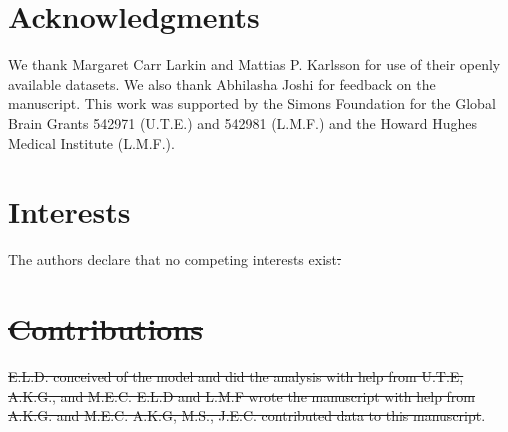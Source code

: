 \documentclass[9pt,lineno]{elife}
\providecommand{\DIFdel}[1]{{\protect\color{red}\sout{#1}}}                      %
\providecommand{\DIFdelbegin}{} %
\providecommand{\DIFdelend}{} %
\newcommand{\DIFscaledelfig}{0.5}
\newlength{\DIFdelgraphicswidth} %
\newlength{\DIFdelgraphicsheight} %
\newcommand{\DIFdelincludegraphics}[2][]{%
\sbox{\DIFdelgraphicsbox}{\DIFOincludegraphics[#1]{#2}}%
\settoboxwidth{\DIFdelgraphicswidth}{\DIFdelgraphicsbox} %
\settoboxtotalheight{\DIFdelgraphicsheight}{\DIFdelgraphicsbox} %
\scalebox{\DIFscaledelfig}{%
\parbox[b]{\DIFdelgraphicswidth}{\usebox{\DIFdelgraphicsbox}\\[-\baselineskip] \rule{\DIFdelgraphicswidth}{0em}}\llap{\resizebox{\DIFdelgraphicswidth}{\DIFdelgraphicsheight}{%
\setlength{\unitlength}{\DIFdelgraphicswidth}%
\begin{picture}(1,1)%
\thicklines\linethickness{2pt} %
{\color[rgb]{1,0,0}\put(0,0){\framebox(1,1){}}}%
{\color[rgb]{1,0,0}\put(0,0){\line( 1,1){1}}}%
{\color[rgb]{1,0,0}\put(0,1){\line(1,-1){1}}}%
\end{picture}%
}\hspace*{3pt}}} %
} %
\DeclareRobustCommand{\DIFdelbegin}{\DIFOdelbegin \let\includegraphics\DIFdelincludegraphics} %
\DeclareRobustCommand{\DIFdelend}{\DIFOaddend \let\includegraphics\DIFOincludegraphics} %
\begin{document}
\section{Acknowledgments}
We thank Margaret Carr Larkin and Mattias P. Karlsson for use of their openly available datasets. We also thank Abhilasha Joshi for feedback on the manuscript. This work was supported by the Simons Foundation for the Global Brain Grants 542971 (U.T.E.) and 542981 (L.M.F.) and the Howard Hughes Medical Institute (L.M.F.).

\section{Interests}
The authors declare that no competing interests exist\DIFdelbegin \DIFdel{.
}%

\section{\DIFdel{Contributions}}
\addtocounter{section}{-1}%
\DIFdel{E.L.D. conceived of the model and did the analysis with help from U.T.E, A.K.G., and M.E.C. E.L.D and L.M.F wrote the manuscript with help from A.K.G. and M.E.C. A.K.G, M.S., J.E.C. contributed data to this manuscript}\DIFdelend .


\end{document}
